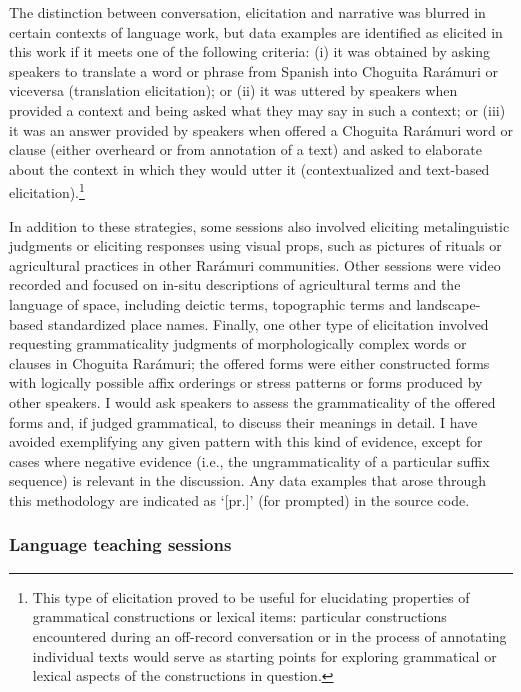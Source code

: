 The distinction between conversation, elicitation and narrative was blurred in certain contexts of language work, but data examples are identified as elicited in this work if it meets one of the following criteria: (i) it was obtained by asking speakers to translate a word or phrase from {Spanish} into Choguita Rarámuri or viceversa (translation elicitation); or (ii) it was uttered by speakers when provided a context and being asked what they may say in such a context; or (iii) it was an answer provided by speakers when offered a Choguita Rarámuri word or clause (either overheard or from annotation of a text) and asked to elaborate about the context in which they would utter it (contextualized and text-based elicitation).\footnote{This type of elicitation proved to be useful for elucidating properties of grammatical constructions or lexical items: particular constructions encountered during an off-record conversation or in the process of annotating individual texts would serve as starting points for exploring grammatical or lexical aspects of the constructions in question.}

In addition to these strategies, some sessions also involved eliciting metalinguistic judgments or eliciting responses using visual props, such as pictures of rituals or agricultural practices in other Rarámuri communities. Other sessions were video recorded and focused on in-situ descriptions of agricultural terms and the language of space, including deictic terms, topographic terms and landscape-based standardized place names. Finally, one other type of elicitation involved requesting grammaticality judgments of morphologically complex words or clauses in Choguita Rarámuri; the offered forms were either constructed forms with logically possible affix orderings or stress patterns or forms produced by other speakers. I would ask speakers to assess the grammaticality of the offered forms and, if judged grammatical, to discuss their meanings in detail. I have avoided exemplifying any given pattern with this kind of evidence, except for cases where negative evidence (i.e., the ungrammaticality of a particular suffix sequence) is relevant in the discussion. Any data examples that arose through this methodology are indicated as `[pr.]' (for prompted) in the source code.

\subsubsection{Language teaching sessions}
\label{subsubsec: language teaching}

